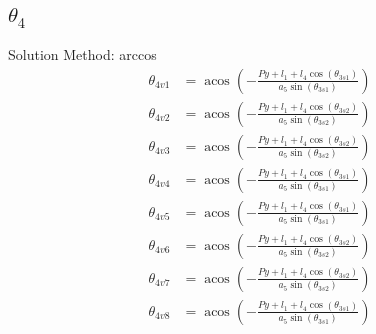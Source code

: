 \documentclass[letterpaper]{article}
\begin{document}
\subsection{$\theta_{4}$ } 
Solution Method: arccos
\begin{align}
  \theta_{4v1} &= \operatorname{acos}{\left(- \frac{Py + l_{1} + l_{4} \cos{\left(\theta_{3s1} \right)}}{a_{5} \sin{\left(\theta_{3s1} \right)}} \right)} \\
  \theta_{4v2} &= \operatorname{acos}{\left(- \frac{Py + l_{1} + l_{4} \cos{\left(\theta_{3s2} \right)}}{a_{5} \sin{\left(\theta_{3s2} \right)}} \right)} \\
  \theta_{4v3} &= \operatorname{acos}{\left(- \frac{Py + l_{1} + l_{4} \cos{\left(\theta_{3s2} \right)}}{a_{5} \sin{\left(\theta_{3s2} \right)}} \right)} \\
  \theta_{4v4} &= \operatorname{acos}{\left(- \frac{Py + l_{1} + l_{4} \cos{\left(\theta_{3s1} \right)}}{a_{5} \sin{\left(\theta_{3s1} \right)}} \right)} \\
  \theta_{4v5} &= \operatorname{acos}{\left(- \frac{Py + l_{1} + l_{4} \cos{\left(\theta_{3s1} \right)}}{a_{5} \sin{\left(\theta_{3s1} \right)}} \right)} \\
  \theta_{4v6} &= \operatorname{acos}{\left(- \frac{Py + l_{1} + l_{4} \cos{\left(\theta_{3s2} \right)}}{a_{5} \sin{\left(\theta_{3s2} \right)}} \right)} \\
  \theta_{4v7} &= \operatorname{acos}{\left(- \frac{Py + l_{1} + l_{4} \cos{\left(\theta_{3s2} \right)}}{a_{5} \sin{\left(\theta_{3s2} \right)}} \right)} \\
  \theta_{4v8} &= \operatorname{acos}{\left(- \frac{Py + l_{1} + l_{4} \cos{\left(\theta_{3s1} \right)}}{a_{5} \sin{\left(\theta_{3s1} \right)}} \right)} \end{align} 
\end{document}
